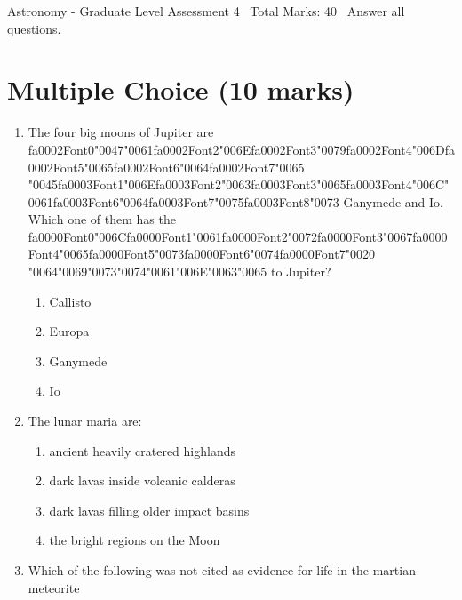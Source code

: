 \documentclass[12pt]{article}
\begin{document}
\begin{center}
Astronomy - Graduate Level Assessment 4 \
Total Marks: 40 \
Answer all questions.
\end{center}

\section*{Multiple Choice (10 marks)}
\begin{enumerate}[label=\arabic*.]
\item The four big moons of Jupiter are {\csname fa0002Font0\endcsname\char"0047}{\char"0061}{\csname fa0002Font2\endcsname\char"006E}{\csname fa0002Font3\endcsname\char"0079}{\csname fa0002Font4\endcsname\char"006D}{\csname fa0002Font5\endcsname\char"0065}{\csname fa0002Font6\endcsname\char"0064}{\csname fa0002Font7\endcsname\char"0065} {\char"0045}{\csname fa0003Font1\endcsname\char"006E}{\csname fa0003Font2\endcsname\char"0063}{\csname fa0003Font3\endcsname\char"0065}{\csname fa0003Font4\endcsname\char"006C}{\char"0061}{\csname fa0003Font6\endcsname\char"0064}{\csname fa0003Font7\endcsname\char"0075}{\csname fa0003Font8\endcsname\char"0073} Ganymede and Io. Which one of them has
the {\csname fa0000Font0\endcsname\char"006C}{\csname fa0000Font1\endcsname\char"0061}{\csname fa0000Font2\endcsname\char"0072}{\csname fa0000Font3\endcsname\char"0067}{\csname fa0000Font4\endcsname\char"0065}{\csname fa0000Font5\endcsname\char"0073}{\csname fa0000Font6\endcsname\char"0074}{\csname fa0000Font7\endcsname\char"0020} {\char"0064}{\char"0069}{\char"0073}{\char"0074}{\char"0061}{\char"006E}{\char"0063}{\char"0065} to Jupiter?
\begin{enumerate}[label=(\alph*)]
    \item Callisto
    \item Europa
    \item Ganymede
    \item Io
\end{enumerate}
\item The lunar maria are:
\begin{enumerate}[label=(\alph*)]
    \item ancient heavily cratered highlands
    \item dark lavas inside volcanic calderas
    \item dark lavas filling older impact basins
    \item the bright regions on the Moon
\end{enumerate}
\item Which of the following was not cited as evidence for life in the martian meteorite

\end{enumerate}
\end{document}
